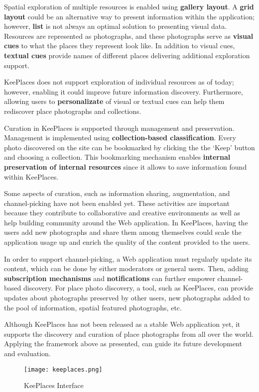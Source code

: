 {Spatial exploration of multiple resources is enabled using \textbf{gallery layout}. A \textbf{grid layout} could be an alternative way to present information within the application; however, \textbf{list} is not always an optimal solution to presenting visual data. 
Resources are represented as photographs, and these photographs serve as \textbf{visual cues} to what the places they represent look like. In addition to visual cues, \textbf{textual cues} provide names of different places delivering additional exploration support.

KeePlaces does not support exploration of individual resources as of today; however, enabling it could improve future information discovery. Furthermore, allowing users to \textbf{personalizate} of visual or textual cues can help them rediscover place photographs and collections. 

Curation in KeePlaces is supported through management and preservation. Management is implemented using \textbf{collection-based classification}.
Every photo discovered on the site can be bookmarked by clicking the the `Keep' button and choosing a collection. This bookmarking mechanism enables \textbf{internal preservation of internal resources} since it allows to save information found within KeePlaces. 

Some aspects of curation, such as information sharing, augmentation, and channel-picking have not been enabled yet. These activities are important because they contribute to collaborative and creative environments as well as help building community around the Web application. In KeePlaces, having the users add new photographs and share them among themselves could scale the application usage up and enrich the quality of the content provided to the users. 

In order to support channel-picking, a Web application must regularly update its content, which can be done by either moderators or general users. Then, adding \textbf{subscription mechanisms} and \textbf{notifications} can further empower channel-based discovery.  For place photo discovery, a tool, such as KeePlaces, can provide updates about photographs preserved by other users, new photographs added to the pool of information, spatial featured photographs, etc.

Although KeePlaces has not been released as a stable Web application yet, it supports the discovery and curation of place photographs from all over the world. Applying the framework above as presented, can guide its future development and evaluation.

\begin{figure}[ht!]
	\noindent
	\centering
	\texttt{[image: keeplaces.png]}
	\caption{KeePlaces Interface}
	\label{fig:keeplaces} 
\end{figure}

} %

